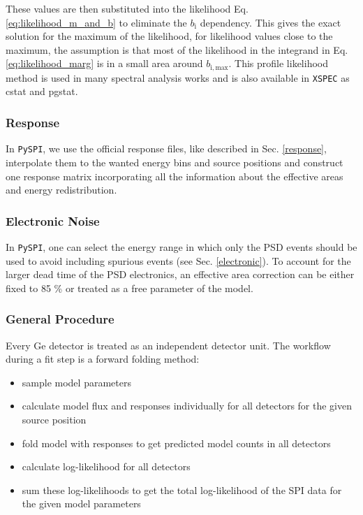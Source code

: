 \documentclass[twocolumn,traditabstract]{aa}
\begin{document}
These values are then substituted into the likelihood Eq. \ref{eq:likelihood_m_and_b} to eliminate the $b_{\mathrm{i}}$ dependency. This gives the exact solution for the maximum of the likelihood, for likelihood values close to the maximum, the assumption is that most of the likelihood in the integrand in Eq. \ref{eq:likelihood_marg} is in a small area around $b_{\mathrm{i,max}}$.
This profile likelihood method is used in many spectral analysis works \citep[e.g.][]{profile2, profile1} and is also available in {\tt XSPEC} \citep{xspec} as cstat and pgstat.

\subsubsection{Response}

In {\tt PySPI}, we use the official response files, like described in Sec. \ref{response}, interpolate them to the wanted energy bins and source positions and construct one response matrix incorporating all the information about the effective areas and energy redistribution.

\subsubsection{Electronic Noise}

In {\tt PySPI}, one can select the energy range in which only the PSD events should be used to avoid including spurious events (see Sec. \ref{electronic}). To account for the larger dead time of the PSD electronics, an effective area correction can be either fixed to 85 \% \citep{spi_electronic_noise} or treated as a free parameter of the model.

\subsubsection{General Procedure}

Every Ge detector is treated as an independent detector unit. The workflow during a fit step is a forward folding method:
\begin{itemize}
  \item sample model parameters
  \item calculate model flux and responses individually for all detectors for the given source position
  \item fold model with responses to get predicted model counts in all detectors
  \item calculate log-likelihood for all detectors
  \item sum these log-likelihoods to get the total log-likelihood of the SPI data for the given model parameters
\end{itemize}
\end{document}
